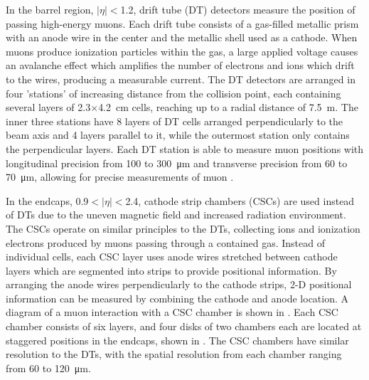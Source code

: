 In the barrel region, $\lvert\eta\rvert<$1.2, drift tube (DT) detectors measure the position of passing high-energy muons. 
Each drift tube consists of a gas-filled metallic prism with an anode wire in the center and the metallic shell used as a cathode.
When muons produce ionization particles within the gas, a large applied voltage causes an avalanche effect which amplifies the number of electrons and ions which drift to the wires, producing a measurable current.
The DT detectors are arranged in four 'stations' of increasing distance from the collision point, each containing several layers of 2.3$\times$\SI{4.2}{\centi\meter} cells, reaching up to a radial distance of \SI{7.5}{\meter}. 
The inner three stations have 8 layers of DT cells arranged perpendicularly to the beam axis and 4 layers parallel to it, while the outermost station only contains the perpendicular layers.
Each DT station is able to measure muon positions with longitudinal precision from 100 to \SI{300}{\micro\meter} and transverse precision from  60 to \SI{70}{\micro\meter}, allowing for precise measurements of muon \pt. 

In the endcaps, 0.9$<\lvert\eta\rvert<$2.4, cathode strip chambers (CSCs) are used instead of DTs due to the uneven magnetic field and increased radiation environment.
The CSCs operate on similar principles to the DTs, collecting ions and ionization electrons produced by muons passing through a contained gas. 
Instead of individual cells, each CSC layer uses anode wires stretched between cathode layers which are segmented into strips to provide positional information. 
By arranging the anode wires perpendicularly to the cathode strips, 2-D positional information can be measured by combining the cathode and anode location. 
A diagram of a muon interaction with a CSC chamber is shown in .
Each CSC chamber consists of six layers, and four disks of two chambers each are located at staggered positions in the endcaps, shown in . 
The CSC chambers have similar resolution to the DTs, with the spatial resolution from each chamber ranging from 60 to \SI{120}{\micro\meter}.

